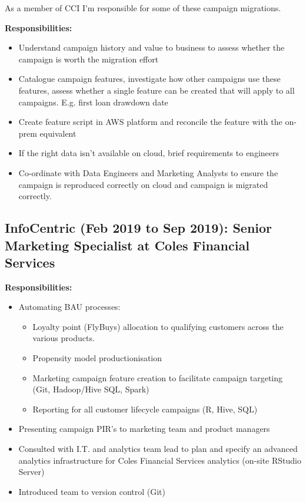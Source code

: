 \documentclass{article}
\begin{document}
\begin{itemize}
        As a member of CCI I'm responsible for some of these campaign migrations.

        \textbf{Responsibilities:}

        \begin{itemize}
            \item Understand campaign history and value to business to assess whether the campaign is worth the migration effort
            \item Catalogue campaign features, investigate how other campaigns use these features, assess whether a single feature can be created that will apply to all campaigns. E.g. first loan drawdown date
            \item Create feature script in AWS platform and reconcile the feature with the on-prem equivalent
            \item If the right data isn't available on cloud, brief requirements to engineers
            \item Co-ordinate with Data Engineers and Marketing Analysts to ensure the campaign is reproduced correctly on cloud and campaign is migrated correctly.
        \end{itemize}
\end{itemize}

\subsection{InfoCentric (Feb 2019 to Sep 2019): Senior Marketing Specialist at Coles Financial Services}

\textbf{Responsibilities:}

\begin{itemize}
    \item Automating BAU processes:
        \begin{itemize}
            \item Loyalty point (FlyBuys) allocation to qualifying customers across the various products.
            \item Propensity model productionisation 
            \item Marketing campaign feature creation to facilitate campaign targeting (Git, Hadoop/Hive SQL, Spark)
            \item Reporting for all customer lifecycle campaigns (R, Hive, SQL)
        \end{itemize}
    \item Presenting campaign PIR’s to marketing team and product managers
    \item Consulted with I.T. and analytics team lead to plan and specify an advanced analytics infrastructure for Coles Financial Services analytics (on-site RStudio Server)
    \item Introduced team to version control (Git)
\end{itemize}
\end{document}
